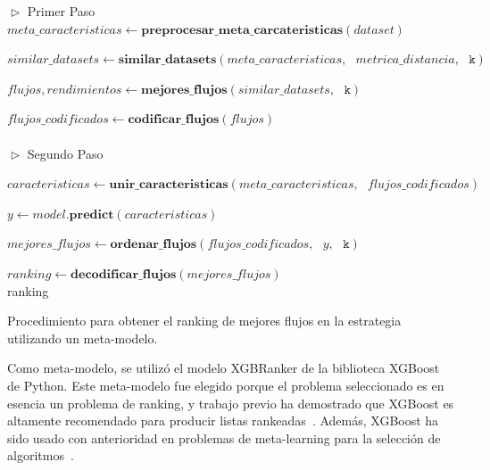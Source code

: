 
\begin{algorithm}[H]
	\begin{algorithmic}
		\State $\vartriangleright$ Primer Paso
		\State $meta\_caracteristicas \gets \textbf{preprocesar\_meta\_carcateristicas}(dataset)$
		
		\State $similar\_datasets \gets \textbf{similar\_datasets}(meta\_caracteristicas,\text{ }metrica\_distancia,\text{ }\texttt{k})$  
		
		\State $flujos, rendimientos \gets \textbf{mejores\_flujos}(similar\_datasets,\text{ } \texttt{k})$
		
		\State $flujos\_codificados \gets \textbf{codificar\_flujos}(flujos)$ \\\\
		
		$\vartriangleright$ Segundo Paso
		
		\State $caracteristicas \gets \textbf{unir\_caracteristicas}(meta\_caracteristicas,\text{ }flujos\_codificados)$
		
		\State $y \gets model.\textbf{predict}(caracteristicas)$ 
		
		\State $mejores\_flujos \gets \textbf{ordenar\_flujos}(flujos\_codificados,\text{ }y,\text{ }\texttt{k})$
		
		\State $ranking \gets \textbf{decodificar\_flujos}(mejores\_flujos)$ \\
		
		\Return ranking
	\end{algorithmic}
	\caption{Procedimiento para obtener el ranking de mejores flujos en la estrategia utilizando un meta-modelo.}
	\label{alg:ranker.proc}
\end{algorithm}


Como meta-modelo, se utilizó el modelo XGBRanker de la biblioteca XGBoost~\cite{xgboost} de Python. Este meta-modelo fue elegido porque el problema seleccionado es en esencia un problema de ranking, y trabajo previo ha demostrado que XGBoost es altamente recomendado para producir listas rankeadas~\cite{rankml}. Además, XGBoost ha sido usado con anterioridad en problemas de meta-learning para la selección de algoritmos~\cite{rankml, atomic}.

